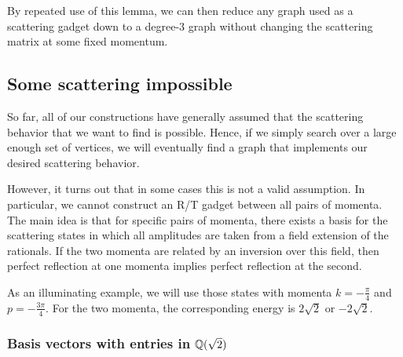 \documentclass[../thesis-main/thesis-main]{subfiles}
\begin{document}
By repeated use of this lemma, we can then reduce any graph used as a scattering gadget down to a degree-3 graph without changing the scattering matrix at some fixed momentum.



\subsection{Some scattering impossible}

So far, all of our constructions have generally assumed that the scattering behavior that we want to find is possible.  Hence, if we simply search over a large enough set of vertices, we will eventually find a graph that implements our desired scattering behavior.

However, it turns out that in some cases this is not a valid assumption.  In particular, we cannot construct an R/T gadget between all pairs of momenta.  The main idea is that for specific pairs of momenta, there exists a basis for the scattering states in which all amplitudes are taken from a field extension of the rationals.  If the two momenta are related by an inversion over this field, then perfect reflection at one momenta implies perfect reflection at the second.  

As an illuminating example, we will use those states with momenta $k= -\frac{\pi}{4}$ and $p = - \frac{3\pi}{4}$.  For the two momenta, the corresponding energy is $2 \sqrt{2}$ or $-2\sqrt{2}$. 



\subsubsection{Basis vectors with entries in $\mathbb{Q}(\sqrt{2})$}
\label{sec:vecs_over_field}
\end{document}
